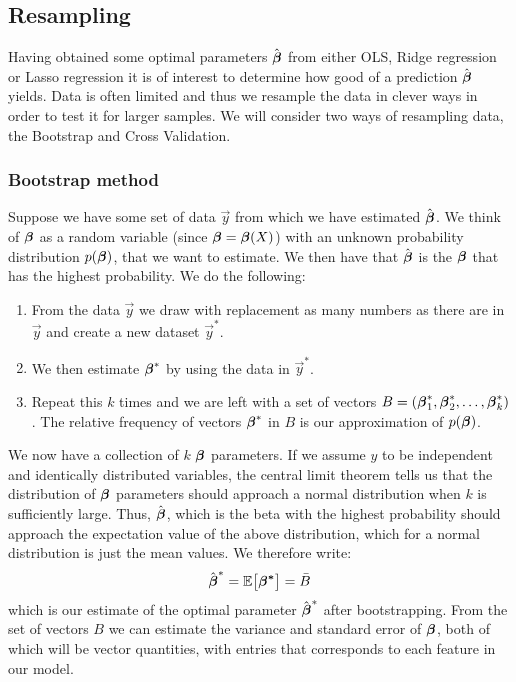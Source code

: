 \subsection{Resampling}\label{sec:resampling}
Having obtained some optimal parameters $\hat{\boldsymbol{\beta}}$ from either OLS, Ridge regression or Lasso regression it is of interest to determine how good of a prediction $\hat{\boldsymbol{\beta}}$ yields. Data is often limited and thus we resample the data in clever ways in order to test it for larger samples. We will consider two ways of resampling data, the Bootstrap and Cross Validation. 

\subsubsection{Bootstrap method}\label{sec:bootstrap}
Suppose we have some set of data $\vec{y}$ from which we have estimated $\hat{\boldsymbol{\beta}}$. We think of $\boldsymbol{\beta}$ as a random variable (since $\boldsymbol{\beta}=\boldsymbol{\beta}(X)$) with an unknown probability distribution $p(\mathbf{\boldsymbol{\beta}})$, that we want to estimate. We then have that $\hat{\boldsymbol{\beta}}$ is the $\boldsymbol{\beta}$ that has the highest probability. We do the following:
\begin{enumerate}
    \item From the data $\vec{y}$ we draw with replacement as many numbers as there are in $\vec{y}$ and create a new dataset $\vec{y}^*$.
    \item We then estimate $\boldsymbol{\beta}^*$ by using the data in $\vec{y}^*$. 
    \item Repeat this $k$ times and we are left with a set of vectors $B = (\boldsymbol{\beta}^*_1, \boldsymbol{\beta}^*_2, \dots, \boldsymbol{\beta}^*_k)$. The relative frequency of vectors $\boldsymbol{\beta}^*$ in $B$ is our approximation of $p(\boldsymbol{\beta})$. 
\end{enumerate}
We now have a collection of $k$ $\boldsymbol{\beta}$ parameters. If we assume $y$ to be independent and identically distributed variables, the central limit theorem tells us that the distribution of $\boldsymbol{\beta}$ parameters should approach a normal distribution when $k$ is sufficiently large. Thus, $\hat{\boldsymbol{\beta}}$, which is the beta with the highest probability should approach the expectation value of the above distribution, which for a normal distribution is just the mean values. We therefore write:
\begin{align*}
    \hat{\boldsymbol{\beta}}^* = \mathbb{E}\big[\boldsymbol{\beta^*}\big] = \bar{B} 
\end{align*}
which is our estimate of the optimal parameter $\hat{\boldsymbol{\beta}}^*$ after bootstrapping. From the set of vectors $B$ we can estimate the variance and standard error of $\boldsymbol{\beta}$, both of which will be vector quantities, with entries that corresponds to each feature in our model. 

